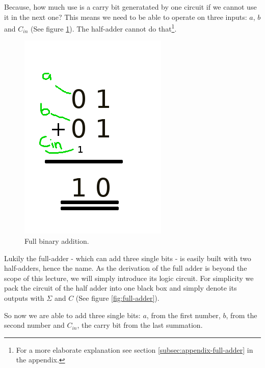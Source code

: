 \documentclass[10pt,a4paper]{article}
\begin{document}
Because, how much use is a carry bit generatated by one circuit if we cannot use it in the next one? This means we need to be able to operate on three inputs: $a$, $b$ and $C_{in}$ (See figure \ref{fig:full-binary-addition}). The half-adder cannot do that\footnote{For a more elaborate explanation see section \ref{subsec:appendix-full-adder} in the appendix.}.

\begin{figure}[H]
	\centering		  
	\includegraphics[scale=0.3]{full_binary_addition.png}
	\caption{Full binary addition.}
	\label{fig:full-binary-addition}
\end{figure}






Lukily the full-adder - which can add three single bits - is easily built with two half-adders, hence the name. As the derivation of the full adder is beyond the scope of this lecture, we will simply introduce its logic circuit. For simplicity we pack the circuit of the half adder into one black box and simply denote its outputs with $\Sigma$ and $C$ (See figure \ref{fig:full-adder}).

So now we are able to add three single bits: $a$, from the first number, $b$, from the second number and $C_{in}$, the carry bit from the last summation. 
\end{document}
